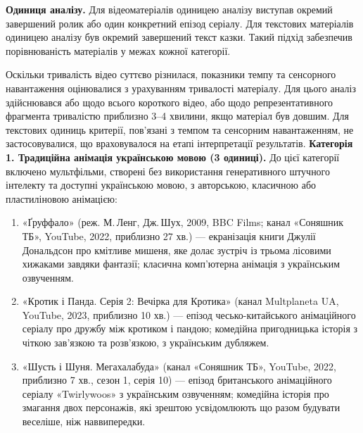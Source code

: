 \documentclass[14pt, a4paper]{extreport}
\begin{document}
\textbf{Одиниця аналізу.}
Для відеоматеріалів одиницею аналізу виступав окремий завершений ролик або один конкретний епізод серіалу. Для текстових матеріалів одиницею аналізу був окремий завершений текст казки. Такий підхід забезпечив порівнюваність матеріалів у межах кожної категорії.

Оскільки тривалість відео суттєво різнилася, показники темпу та сенсорного навантаження оцінювалися з урахуванням тривалості матеріалу. Для цього аналіз здійснювався або щодо всього короткого відео, або щодо репрезентативного фрагмента тривалістю приблизно 3--4 хвилини, якщо матеріал був довшим. Для текстових одиниць критерії, пов'язані з темпом та сенсорним навантаженням, не застосовувалися, що враховувалося на етапі інтерпретації результатів.
\newpage
\textbf{Категорія 1. Традиційна анімація українською мовою (3 одиниці).}
До цієї категорії включено мультфільми, створені без використання генеративного штучного інтелекту та доступні українською мовою, з авторською, класичною або пластиліновою анімацією:
\begin{enumerate}
  \item «Ґруффало» (реж. М.\,Ленг, Дж.\,Шух, 2009, BBC Films; канал «Соняшник ТБ», YouTube, 2022, приблизно 27 хв.) --- екранізація книги Джулії Дональдсон про кмітливе мишеня, яке долає зустріч із трьома лісовими хижаками завдяки фантазії; класична комп'ютерна анімація з українським озвученням.
  \item «Кротик і Панда. Серія 2: Вечірка для Кротика» (канал Multplaneta UA, YouTube, 2023, приблизно 10 хв.) --- епізод чесько-китайського анімаційного серіалу про дружбу між кротиком і пандою; комедійна пригодницька історія з чіткою зав'язкою та розв'язкою, з українським дубляжем.
  \item «Шусть і Шуня. Мегахалабуда» (канал «Соняшник ТБ», YouTube, 2022, приблизно 7 хв., сезон 1, серія 10) --- епізод британського анімаційного серіалу «Twirlywoos» з українським озвученням; комедійна історія про змагання двох персонажів, які зрештою усвідомлюють що разом будувати веселіше, ніж наввипередки.
\end{enumerate}
\end{document}
